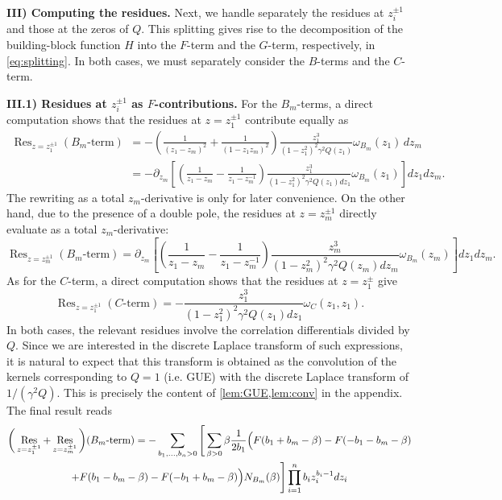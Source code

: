 \documentclass[a4paper,11pt,english]{article}
\theoremstyle{plain}
\theoremstyle{definition}
\theoremstyle{plain}
\newcommand{\de}{\partial}
\DeclareMathOperator*{\Res}{Res}
\begin{document}
{\bfseries III) Computing the residues.} Next, we handle separately the residues at $z_i^{\pm 1}$ and those at the zeros of $Q$. This splitting gives rise to the decomposition of the building-block function $H$ into the $F$-term and the $G$-term, respectively, in \cref{eq:splitting}. In both cases, we must separately consider the $B$-terms and the $C$-term.

{\bfseries III.1) Residues at $z_i^{\pm 1}$ as $F$-contributions.} For the $B_m$-terms, a direct computation shows that the residues at $z = z_1^{\pm 1}$ contribute equally as
\begin{equation}
\begin{split}
	\Res_{z = z_1^{\pm 1}} (B_m\text{-term})
	& =
	-
	\left(
		\frac{1}{(z_1 - z_m)^2} + \frac{1}{(1 - z_1z_m)^2}
	\right)
	\frac{z_1^3}{(1-z_1^2)^2 \gamma^2 Q(z_1)}
	\omega_{B_m}(z_1) \, dz_m \\
	& =
	-
	\de_{z_m} \left[
		\left(
			\frac{1}{z_1 - z_m} - \frac{1}{z_1 - z_m^{-1}}
		\right)
		\frac{z_1^3}{(1-z_1^2)^2 \gamma^2 Q(z_1) dz_1}
		\omega_{B_m}(z_1)
	\right] dz_1 dz_m.
\end{split}
\end{equation}
The rewriting as a total $z_m$-derivative is only for later convenience. On the other hand, due to the presence of a double pole, the residues at $z = z_m^{\pm 1}$ directly evaluate as a total $z_m$-derivative:
\begin{equation}
	\Res_{z = z_m^{\pm 1}} (B_m\text{-term})
	=
	\de_{z_m} \left[
		\left(
			  \frac{1}{z_1 - z_m} - \frac{1}{z_1 - z_m^{-1}}
		\right)
		\frac{z_m^3}{(1 - z_m^2)^2 \gamma^2 Q(z_m) dz_m}
		\omega_{B_m}(z_m)
	\right] dz_1 dz_m.
\end{equation}
As for the $C$-term, a direct computation shows that the residues at $z = z_1^{\pm}$ give
\begin{equation}
	\Res_{z = z_1^{\pm 1}}
		(C\text{-term})
	=
	- \frac{z_1^3}{(1-z_1^2)^2 \gamma^2 Q(z_1) dz_1} \omega_C(z_1,z_1) .
\end{equation}
In both cases, the relevant residues involve the correlation differentials divided by $Q$. Since we are interested in the discrete Laplace transform of such expressions, it is natural to expect that this transform is obtained as the convolution of the kernels corresponding to $Q = 1$ (i.e. GUE) with the discrete Laplace transform of $1/(\gamma^2 Q)$. This is precisely the content of \cref{lem:GUE,lem:conv} in the appendix. The final result reads
\begin{multline}
	\bigg(
		\Res_{z = z_1^{\pm 1}}
		+
		\Res_{z = z_m^{\pm 1}}
	\bigg) (B_m\text{-term})
	=
	-
	\sum_{b_1,\ldots,b_n > 0}
		\Bigg[
			\sum_{\beta > 0}
				\beta 
				\frac{1}{2b_1} \Bigl(
					F(b_1 + b_m - \beta)
					-
					F(-b_1 - b_m - \beta) \\
					+
					F(b_1 - b_m - \beta)
					-
					F(-b_1 + b_m - \beta)
				\Bigr) N_{B_m}(\beta)
		\Bigg] \prod_{i=1}^n b_i z_i^{b_i -1} dz_i
\end{multline}
\end{document}
